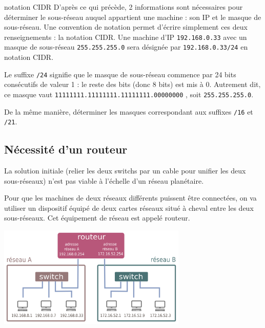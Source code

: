 \documentclass[a4paper,dvipsnames]{article}
\begin{document}
\begin{definition}[breakable]{notation CIDR}{}
  D'après ce qui précède, 2 informations sont nécessaires pour déterminer le sous-réseau auquel appartient une machine : son IP et le masque de sous-réseau. Une convention de notation permet d'écrire simplement ces deux renseignements : la notation CIDR. 
  \tcblower
  Une machine d'IP \texttt{192.168.0.33} avec un masque de sous-réseau \texttt{255.255.255.0} sera désignée par \texttt{192.168.0.33/24} en notation CIDR.

  Le suffixe \texttt{/24} signifie que le masque de sous-réseau commence par 24 bits consécutifs de valeur 1 : le reste des bits (donc 8 bits) est mis à 0.
  Autrement dit, ce masque vaut \texttt{11111111.11111111.11111111.00000000} , soit \texttt{255.255.255.0}.
\end{definition}

\medskip

\begin{exercice}[breakable]{}{}
  De la même manière, déterminer les masques correspondant aux suffixes \texttt{/16} et \texttt{/21}.
\end{exercice}

\subsection{Nécessité d'un routeur}

La solution initiale (relier les deux switchs par un cable pour unifier les deux sous-réseaux) n'est pas viable à l'échelle d'un réseau planétaire.

\smallskip

Pour que les machines de deux réseaux différents puissent être connectées, on va utiliser un dispositif équipé de deux cartes réseaux situé à cheval entre les deux sous-réseaux. Cet équipement de réseau est appelé routeur. 

\begin{center}
  \includegraphics[width=9cm]{img/routeur.png}
\end{center}
\end{document}
